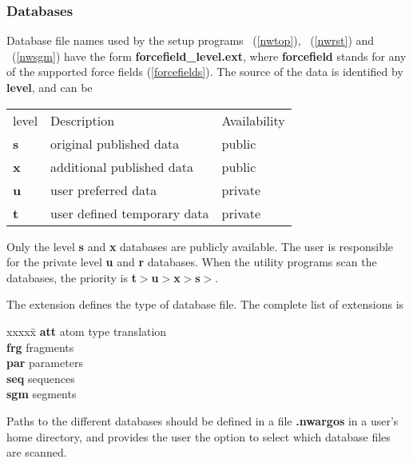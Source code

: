 \subsubsection{Databases}
Database file names used by the setup programs \nwtop\ (\ref{nwtop}), 
\nwrst\ (\ref{nwrst}) and \nwsgm\ (\ref{nwsgm}) have the form
{\bf forcefield\_level.ext}, where {\bf forcefield} stands for any of the
supported force fields (\ref{forcefields}). The source of the data is 
identified by {\bf level}, and can be 
\begin{center}
\begin{tabular}{lll}
\hline
level   & Description                 & Availability \\
{\bf s} & original published data     & public       \\
{\bf x} & additional published data   & public       \\
{\bf u} & user preferred data         & private      \\
{\bf t} & user defined temporary data & private    \\
\hline
\end{tabular}
\end{center}
\par
Only the level {\bf s} and {\bf x} databases are publicly available. 
The user is responsible for the private level {\bf u} and {\bf r}
databases. When the utility programs scan the databases, the priority
is {\bf t}$>${\bf u}$>${\bf x}$>${\bf s}$>$.
\par
The extension defines the type of database file. The complete list of
extensions is
\begin{tabbing}
xxxxx\=\kill
{\bf att} \> atom type translation\\
{\bf frg} \> fragments\\
{\bf par} \> parameters\\
{\bf seq} \> sequences\\
{\bf sgm} \> segments\\
\end{tabbing} 
\par
Paths to the different databases should be defined in a file 
{\bf .nwargos} in a user's home directory, and provides the user the
option to select which database files are scanned.

